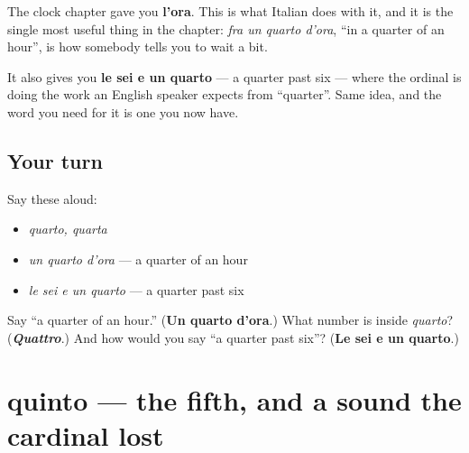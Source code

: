 The clock chapter gave you \textbf{l'ora}. This is what Italian does with it, and it is the single most useful thing in the chapter: \emph{fra un quarto d'ora}, \textquotedblleft{}in a quarter of an hour\textquotedblright{}, is how somebody tells you to wait a bit.

It also gives you \textbf{le sei e un quarto} — a quarter past six — where the ordinal is doing the work an English speaker expects from \textquotedblleft{}quarter\textquotedblright{}. Same idea, and the word you need for it is one you now have.

\subsection*{Your turn}
Say these aloud:

\begin{itemize}
\raggedright
  \item \emph{quarto, quarta}
  \item \emph{un quarto d'ora} — a quarter of an hour
  \item \emph{le sei e un quarto} — a quarter past six
\end{itemize}

\begin{tcolorbox}[breakable,colback=teal!4,colframe=teal!35!black,title={Before you move on}]
Say \textquotedblleft{}a quarter of an hour.\textquotedblright{} (\textbf{Un quarto d'ora}.) What number is inside \emph{quarto}? (\emph{\textbf{Quattro}}.) And how would you say \textquotedblleft{}a quarter past six\textquotedblright{}? (\textbf{Le sei e un quarto}.)
\end{tcolorbox}
\section[quinto / quinta]{quinto — the fifth, and a sound the cardinal lost}

\label{lesson:IT-C26-quinto}



